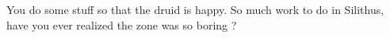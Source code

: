 
You do some stuff so that the druid is happy. So much work to do in Silithus, have you ever realized the zone was so boring ?

